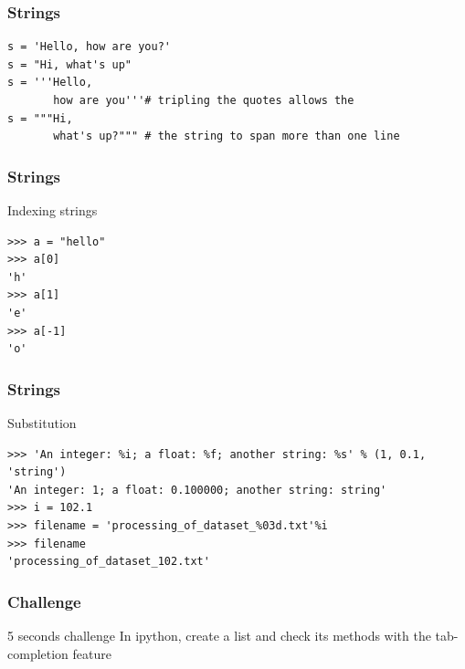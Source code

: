 \documentclass[colorlinks]{beamer}
\begin{document}
\begin{frame}[fragile]\frametitle{Strings}
\begin{block}{}
\small
\begin{verbatim}
s = 'Hello, how are you?'
s = "Hi, what's up"
s = '''Hello,                
       how are you'''# tripling the quotes allows the 
s = """Hi,
       what's up?""" # the string to span more than one line
\end{verbatim}

\end{block}
\end{frame}
\begin{frame}[fragile]\frametitle{Strings}
\begin{block}{Indexing strings}
\begin{verbatim}
>>> a = "hello"
>>> a[0]
'h'
>>> a[1]
'e'
>>> a[-1]
'o'
\end{verbatim}

\end{block}
\end{frame}
\begin{frame}[fragile]\frametitle{Strings}
\begin{block}{Substitution}
\tiny
\begin{verbatim}
>>> 'An integer: %i; a float: %f; another string: %s' % (1, 0.1, 'string')
'An integer: 1; a float: 0.100000; another string: string'
>>> i = 102.1
>>> filename = 'processing_of_dataset_%03d.txt'%i
>>> filename
'processing_of_dataset_102.txt'
\end{verbatim}

\end{block}
\end{frame}

\begin{frame}[fragile]\frametitle{Challenge}
  \begin{block}{5 seconds challenge}
  In ipython, create a list and check its methods with the tab-completion feature
  \end{block}
\end{frame}
\end{document}
